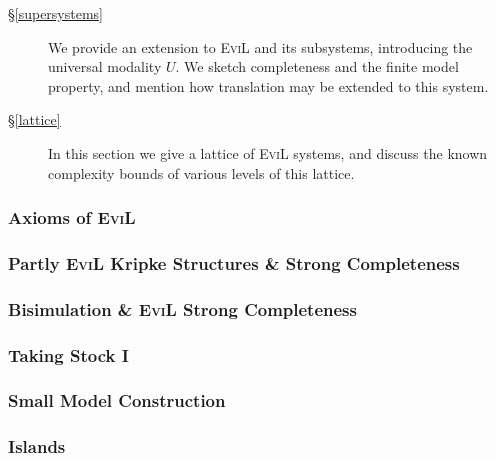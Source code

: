 \begin{description}
  \item[\S\ref{supersystems}] We provide an extension to
    \textsc{EviL} and its subsystems, introducing the universal
    modality $U$. We sketch completeness and the finite model
    property, and mention how translation may be extended to this
    system.

 \item[\S\ref{lattice}]  In this section we give a lattice of
   \textsc{EviL} systems, and discuss the known complexity bounds of
   various levels of this lattice.
\end{description}

%

\subsubsection{Axioms of \textsc{EviL}}\label{evil-axioms}


\subsubsection{Partly \textsc{EviL} Kripke Structures \& Strong Completeness}\label{abstraction}\label{partly-evil-strong-soundness-and-completeness}


\subsubsection{Bisimulation \& \textsc{EviL} Strong Completeness}\label{completely-evil}\label{Abstract-Completeness}


\subsubsection{Taking Stock I}\label{taking-stock}


\subsubsection{Small Model Construction}\label{small-model}


\subsubsection{Islands}\label{islands}


